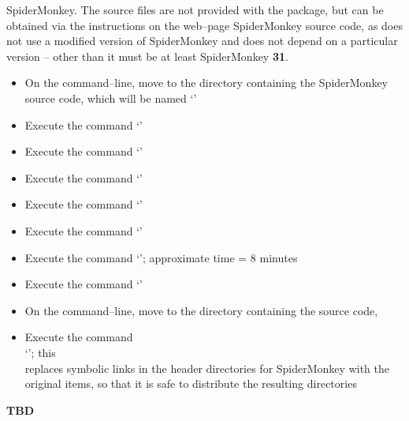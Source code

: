SpiderMonkey.
The source files are not provided with the  package, but can be obtained
via the instructions on the web--page
%
{SpiderMonkey source code}, as \mplusm{} does not use a modified version of SpiderMonkey
and does not depend on a particular version -- other than it must be at least SpiderMonkey
\textbf{31}.
\begin{itemize}
\item On the command--line, move to the directory containing the SpiderMonkey source code,
which will be named `'
\item Execute the command `'
\item Execute the command `'
\item Execute the command `'
\item Execute the command `'
\item Execute the command `'
\item Execute the command `'; approximate time = 8 minutes
\item Execute the command `'
\item On the command--line, move to the directory containing the \mplusm{} source code,
\item Execute the command\\
`';
this\\
replaces symbolic links in the header directories for SpiderMonkey with the original
items, so that it is safe to distribute the resulting directories
\end{itemize}
\tertiaryEnd{}
\textbf{TBD}
\tertiaryEnd{}
\secondaryEnd{}
